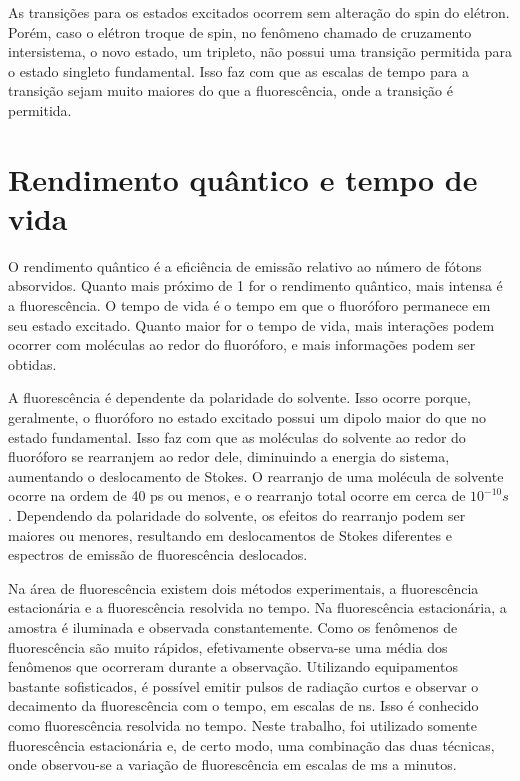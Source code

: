 		As transições para os estados excitados ocorrem sem alteração do spin do elétron. Porém, caso o elétron troque de spin, no fenômeno chamado de cruzamento intersistema, o novo estado, um tripleto, não possui uma transição permitida para o estado singleto fundamental. Isso faz com que as escalas de tempo para a transição sejam muito maiores do que a fluorescência, onde a transição é permitida.
		
		\section{Rendimento quântico e tempo de vida}
				
		O rendimento quântico é a eficiência de emissão relativo ao número de fótons absorvidos. Quanto mais próximo de 1 for o rendimento quântico, mais intensa é a fluorescência. O tempo de vida é o tempo em que o fluoróforo permanece em seu estado excitado. Quanto maior for o tempo de vida, mais interações podem ocorrer com moléculas ao redor do fluoróforo, e mais informações podem ser obtidas.
		
		A fluorescência é dependente da polaridade do solvente. Isso ocorre porque, geralmente, o fluoróforo no estado excitado possui um dipolo maior do que no estado fundamental. Isso faz com que as moléculas do solvente ao redor do fluoróforo se rearranjem ao redor dele, diminuindo a energia do sistema, aumentando o deslocamento de Stokes. O rearranjo de uma molécula de solvente ocorre na ordem de 40 ps ou menos, e o rearranjo total ocorre em cerca de \(10^{-10} s\). Dependendo da polaridade do solvente, os efeitos do rearranjo podem ser maiores ou menores, resultando em deslocamentos de Stokes diferentes e espectros de emissão de fluorescência deslocados.
		
		Na área de fluorescência existem dois métodos experimentais, a fluorescência estacionária e a fluorescência resolvida no tempo. Na fluorescência estacionária, a amostra é iluminada e observada constantemente. Como os fenômenos de fluorescência são muito rápidos, efetivamente observa-se uma média dos fenômenos que ocorreram durante a observação. Utilizando equipamentos bastante sofisticados, é possível emitir pulsos de radiação curtos e observar o decaimento da fluorescência com o tempo, em escalas de ns. Isso é conhecido como fluorescência resolvida no tempo. Neste trabalho, foi utilizado somente fluorescência estacionária e, de certo modo, uma combinação das duas técnicas, onde observou-se a variação de fluorescência em escalas de ms a minutos.
		
